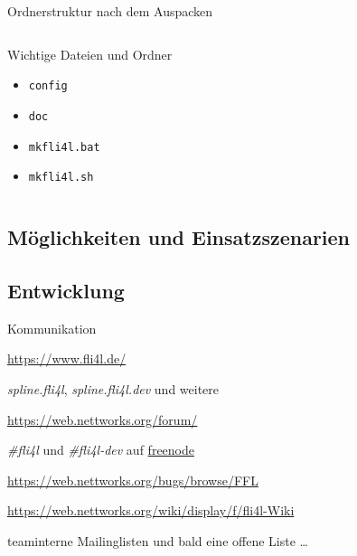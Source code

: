 \documentclass[t]{beamer}
\begin{document}
\begin{frame}{Ordnerstruktur nach dem Auspacken}
    \begin{figure}
    \end{figure}

    \begin{columns}[T,onlytextwidth]
        \begin{column}{0.5\textwidth}
            \begin{block}{Wichtige Dateien und Ordner}
                \begin{itemize}
                    \item \texttt{config}
                    \item \texttt{doc}
                    \item \texttt{mkfli4l.bat}
                    \item \texttt{mkfli4l.sh}
                \end{itemize}
            \end{block}
        \end{column}
        \begin{column}{0.5\textwidth}
            \begin{figure}
            \end{figure}
        \end{column}
    \end{columns}
\end{frame}

\subsection{Möglichkeiten und Einsatzszenarien}

\subsection{Entwicklung}

\begin{frame}{Kommunikation}
    \begin{description}[Newsgroups]
        \item[WWW] \url{https://www.fli4l.de/}
        \item[Newsgroups] \emph{spline.fli4l}, \emph{spline.fli4l.dev}
            und weitere
        \item[Forum] \url{https://web.nettworks.org/forum/}
        \item[IRC] \emph{\#fli4l} und \emph{\#fli4l-dev} auf
            \href{https://freenode.net/}{freenode}
        \item[Bugtracker] \url{https://web.nettworks.org/bugs/browse/FFL}
        \item[Wiki] \small
            \url{https://web.nettworks.org/wiki/display/f/fli4l-Wiki}
            \normalsize
        \item[E-Mail] teaminterne Mailinglisten und bald eine offene Liste …
    \end{description}
\end{frame}
\end{document}
